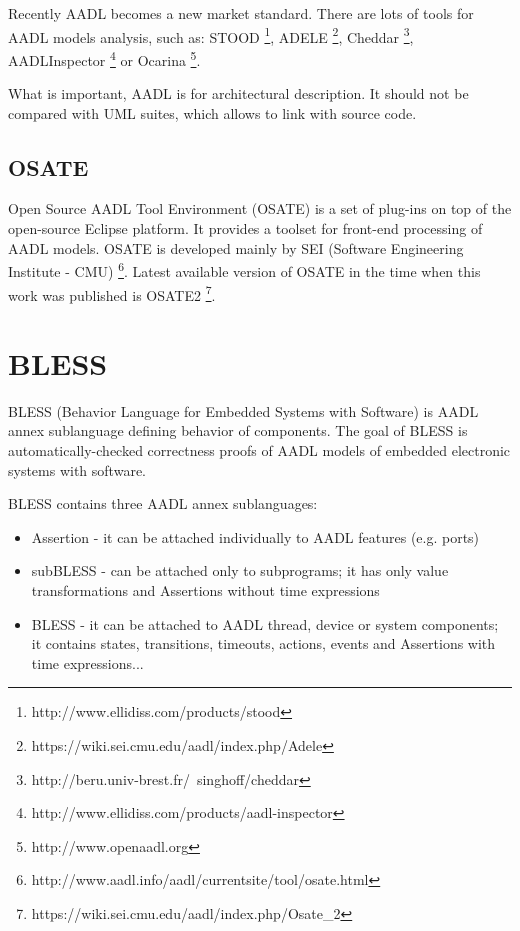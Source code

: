 
Recently AADL becomes a new market standard. There are lots of tools for AADL models analysis, such as: STOOD \footnote{http://www.ellidiss.com/products/stood}, ADELE \footnote{https://wiki.sei.cmu.edu/aadl/index.php/Adele}, Cheddar \footnote{http://beru.univ-brest.fr/~singhoff/cheddar}, AADLInspector \footnote{http://www.ellidiss.com/products/aadl-inspector} or Ocarina \footnote{http://www.openaadl.org}.

What is important, AADL is for architectural description. It should not be compared with UML suites, which allows to link with source code.


\subsection{OSATE}
\label{background:aadl:osate}
Open Source AADL Tool Environment (OSATE) is a set of plug-ins on top of the open-source Eclipse platform. It provides a toolset for front-end processing of AADL models. OSATE is developed mainly by SEI (Software Engineering Institute - CMU) \footnote{http://www.aadl.info/aadl/currentsite/tool/osate.html}. Latest available version of OSATE in the time when this work was published is OSATE2 \footnote{https://wiki.sei.cmu.edu/aadl/index.php/Osate\_2}.



\section{BLESS}
\label{background:bless}
BLESS (Behavior Language for Embedded Systems with Software) is AADL annex sublanguage defining behavior of components. The goal of BLESS is automatically-checked correctness proofs of AADL models of embedded electronic systems with software.

BLESS contains three AADL annex sublanguages:
\begin{itemize} \itemsep1pt \parskip0pt 
	\item Assertion - it can be attached individually to AADL features (e.g. ports)
	\item subBLESS - can be attached only to subprograms; it has only value transformations and Assertions without time expressions
	\item BLESS - it can be attached to AADL thread, device or system components; it contains states, transitions, timeouts, actions, events and Assertions with time expressions...
\end{itemize}

